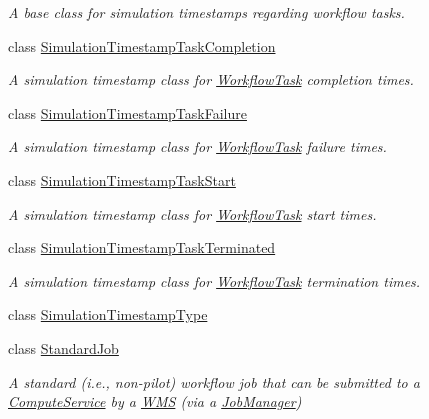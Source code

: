 \begin{DoxyCompactItemize}
\begin{DoxyCompactList}\small\item\em A base class for simulation timestamps regarding workflow tasks. \end{DoxyCompactList}\item 
class \hyperlink{classwrench_1_1_simulation_timestamp_task_completion}{Simulation\+Timestamp\+Task\+Completion}
\begin{DoxyCompactList}\small\item\em A simulation timestamp class for \hyperlink{classwrench_1_1_workflow_task}{Workflow\+Task} completion times. \end{DoxyCompactList}\item 
class \hyperlink{classwrench_1_1_simulation_timestamp_task_failure}{Simulation\+Timestamp\+Task\+Failure}
\begin{DoxyCompactList}\small\item\em A simulation timestamp class for \hyperlink{classwrench_1_1_workflow_task}{Workflow\+Task} failure times. \end{DoxyCompactList}\item 
class \hyperlink{classwrench_1_1_simulation_timestamp_task_start}{Simulation\+Timestamp\+Task\+Start}
\begin{DoxyCompactList}\small\item\em A simulation timestamp class for \hyperlink{classwrench_1_1_workflow_task}{Workflow\+Task} start times. \end{DoxyCompactList}\item 
class \hyperlink{classwrench_1_1_simulation_timestamp_task_terminated}{Simulation\+Timestamp\+Task\+Terminated}
\begin{DoxyCompactList}\small\item\em A simulation timestamp class for \hyperlink{classwrench_1_1_workflow_task}{Workflow\+Task} termination times. \end{DoxyCompactList}\item 
class \hyperlink{classwrench_1_1_simulation_timestamp_type}{Simulation\+Timestamp\+Type}
\item 
class \hyperlink{classwrench_1_1_standard_job}{Standard\+Job}
\begin{DoxyCompactList}\small\item\em A standard (i.\+e., non-\/pilot) workflow job that can be submitted to a \hyperlink{classwrench_1_1_compute_service}{Compute\+Service} by a \hyperlink{classwrench_1_1_w_m_s}{W\+MS} (via a \hyperlink{classwrench_1_1_job_manager}{Job\+Manager}) \end{DoxyCompactList}\item 

\end{DoxyCompactItemize}
